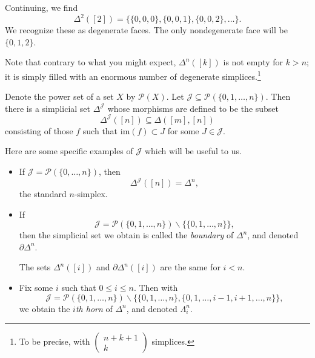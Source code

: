 \documentclass[main.tex]{subfiles}
\begin{document}
Continuing, we find
\begin{equation*}
  \Delta^{2}([2]) = \{\{0,0,0\}, \{0,0,1\}, \{0,0,2\}, \ldots\}.
\end{equation*}
We recognize these as degenerate faces. The only nondegenerate face will be $\{0,1,2\}$.

Note that contrary to what you might expect, $\Delta^{n}([k])$ is not empty for $k > n$; it is simply filled with an enormous number of degenerate simplices.\footnote{To be precise, with $\begin{pmatrix} n+k+1 \\ k \end{pmatrix}$ simplices.}

\begin{example}
  Denote the power set of a set $X$ by $\mathcal{P}(X)$. Let $\mathcal{J} \subseteq \mathcal{P}(\{0, 1, \ldots, n\})$. Then there is a simplicial set $\Delta^{\mathcal{J}}$ whose morphisms are defined to be the subset
  \begin{equation*}
    \Delta^{\mathcal{J}}([n]) \subseteq \Delta([m], [n])
  \end{equation*}
  consisting of those $f$ such that $\mathrm{im}(f) \subset J$ for some $J \in \mathcal{J}$.

  Here are some specific examples of $\mathcal{J}$ which will be useful to us. \begin{itemize}
    \item If $\mathcal{J} = \mathcal{P}(\{0, \ldots, n\})$, then
      \begin{equation*}
        \Delta^{\mathcal{J}}([n]) = \Delta^{n},
      \end{equation*}
      the standard $n$-simplex.

    \item If
      \begin{equation*}
        \mathcal{J} = \mathcal{P}(\{0, 1, \ldots, n\}) \smallsetminus \{\{0, 1, \ldots, n\}\},
      \end{equation*}
      then the simplicial set we obtain is called the \emph{boundary} of $\Delta^{n}$, and denoted $\partial \Delta^{n}$.

      The sets $\Delta^{n}([i])$ and $\partial \Delta^{n}([i])$ are the same for $i < n$. 

    \item Fix some $i$ such that $0 \leq i \leq n$. Then with
      \begin{equation*}
        \mathcal{J} = \mathcal{P}(\{0, 1, \ldots, n\}) \smallsetminus \{\{0, 1, \ldots, n\}, \{0, 1, \ldots, i - 1, i + 1, \ldots, n\}\},
      \end{equation*}
      we obtain the \emph{$i$th horn} of $\Delta^{n}$, and denoted $\Lambda^{n}_{i}$.


\end{itemize}
\end{example}
\end{document}
